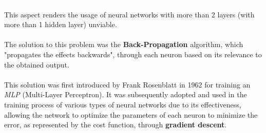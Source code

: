 \documentclass[a4paper, 11pt]{article}
\begin{document}
\textcolor{white}{a}\\
This aspect renders the usage of neural networks with more than 2 layers (with more than 1 hidden layer) unviable.\\
\textcolor{white}{a}\\
The solution to this problem was the \textbf{Back-Propagation} algorithm, which "propagates the effects backwards", through each neuron based on its relevance to the obtained output.\\
\textcolor{white}{a}\\
This solution was first introduced by Frank Rosenblatt in 1962 for training an \textit{MLP} (Multi-Layer Perceptron). It was subsequently adopted and used in the training process of various types of neural networks due to its effectiveness, allowing the network to optimize the parameters of each neuron to minimize the error, as represented by the cost function, through \textbf{gradient descent}.
\newpage 
\end{document}
